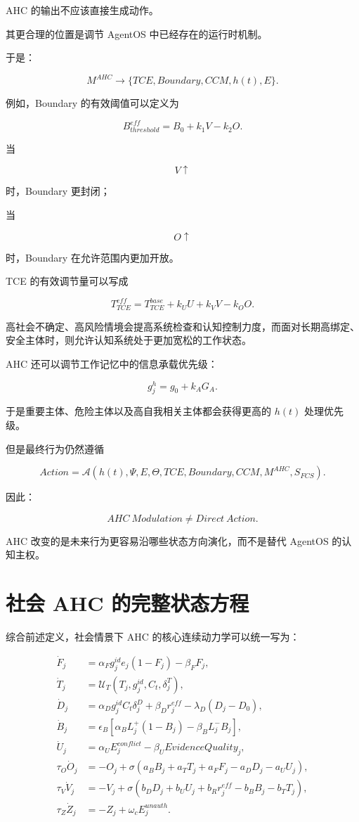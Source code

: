 AHC 的输出不应该直接生成动作。

其更合理的位置是调节 AgentOS 中已经存在的运行时机制。

于是：

\[
M^{AHC}
\rightarrow
\{
TCE,
Boundary,
CCM,
h(t),
E
\}.
\]

例如，Boundary 的有效阈值可以定义为

\[
B_{threshold}^{eff}
=
B_0
+
k_1V
-
k_2O.
\]

当

\[
V\uparrow
\]

时，Boundary 更封闭；

当

\[
O\uparrow
\]

时，Boundary 在允许范围内更加开放。

TCE 的有效调节量可以写成

\[
T_{TCE}^{eff}
=
T_{TCE}^{base}
+
k_UU
+
k_VV
-
k_OO.
\]

高社会不确定、高风险情境会提高系统检查和认知控制力度，而面对长期高绑定、安全主体时，则允许认知系统处于更加宽松的工作状态。

AHC 还可以调节工作记忆中的信息承载优先级：

\[
g_j^h
=
g_0
+
k_AG_A.
\]

于是重要主体、危险主体以及高自我相关主体都会获得更高的 $h(t)$ 处理优先级。

但是最终行为仍然遵循

\[
Action
=
\mathcal A
\left(
h(t),
\Psi,
E,
\Theta,
TCE,
Boundary,
CCM,
M^{AHC},
S_{FCS}
\right).
\]

因此：

\[
\boxed{
AHC\ Modulation
\neq
Direct\ Action.
}
\]

AHC 改变的是未来行为更容易沿哪些状态方向演化，而不是替代 AgentOS 的认知主权。


\section{社会 AHC 的完整状态方程}

综合前述定义，社会情景下 AHC 的核心连续动力学可以统一写为：

\[
\boxed{
\begin{aligned}
\dot F_j
&=
\alpha_F
g_j^{id}
e_j
(1-F_j)
-
\beta_FF_j,
\\[4pt]
\dot T_j
&=
\mathcal U_T
\left(
T_j,
g_j^{id},
C_t,
\delta_j^T
\right),
\\[4pt]
\dot D_j
&=
\alpha_D
g_j^{id}
C_t
\delta_j^D
+
\beta_D
r_j^{eff}
-
\lambda_D
(D_j-D_0),
\\[4pt]
\dot B_j
&=
\epsilon_B
\left[
\alpha_BL_j^+
(1-B_j)
-
\beta_BL_j^-B_j
\right],
\\[4pt]
\dot U_j
&=
\alpha_U
E_j^{conflict}
-
\beta_U
EvidenceQuality_j,
\\[4pt]
\tau_O
\dot O_j
&=
-O_j
+
\sigma
\left(
a_BB_j
+
a_TT_j
+
a_FF_j
-
a_DD_j
-
a_UU_j
\right),
\\[4pt]
\tau_V
\dot V_j
&=
-V_j
+
\sigma
\left(
b_DD_j
+
b_UU_j
+
b_Rr_j^{eff}
-
b_BB_j
-
b_TT_j
\right),
\\[4pt]
\tau_Z
\dot Z_j
&=
-Z_j
+
\omega_c
E_j^{unauth}.
\end{aligned}
}
\]

